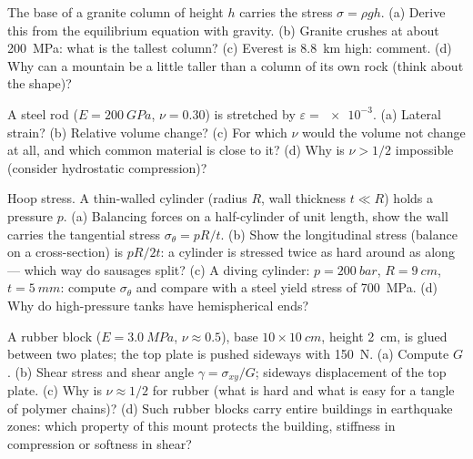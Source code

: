 \begin{exercise}[$\star$]\label{exo:b3:continuum-elasticity:3}
The base of a granite column of height $h$ carries the stress $\sigma
= \rho gh$. (a) Derive this from the equilibrium equation with
gravity. (b) Granite crushes at about \qty{200}{MPa}: what is the
tallest column? (c) Everest is \qty{8.8}{km} high: comment. (d) Why
can a mountain be a little taller than a column of its own rock
(think about the shape)?
\end{exercise}

\begin{exercise}[$\star$]\label{exo:b3:continuum-elasticity:4}
A steel rod ($E = \qty{200}{GPa}$, $\nu = 0.30$) is stretched by
$\varepsilon = \num{e-3}$. (a) Lateral strain? (b) Relative volume
change? (c) For which $\nu$ would the volume not change at all, and
which common material is close to it? (d) Why is $\nu > 1/2$
impossible (consider hydrostatic compression)?
\end{exercise}

\begin{exercise}[$\star\star$]\label{exo:b3:continuum-elasticity:5}
Hoop stress. A thin-walled cylinder (radius $R$, wall thickness $t \ll
R$) holds a pressure $p$. (a) Balancing forces on a half-cylinder of
unit length, show the wall carries the tangential stress
$\sigma_\theta = pR/t$. (b) Show the longitudinal stress (balance on a
cross-section) is $pR/2t$: a cylinder is stressed twice as hard around
as along --- which way do sausages split? (c) A diving cylinder: $p =
\qty{200}{bar}$, $R = \qty{9}{cm}$, $t = \qty{5}{mm}$: compute
$\sigma_\theta$ and compare with a steel yield stress of
\qty{700}{MPa}. (d) Why do high-pressure tanks have hemispherical
ends?
\end{exercise}

\begin{exercise}[$\star\star$]\label{exo:b3:continuum-elasticity:6}
A rubber block ($E = \qty{3.0}{MPa}$, $\nu \approx 0.5$), base $10
\times \qty{10}{cm}$, height \qty{2}{cm}, is glued between two plates;
the top plate is pushed sideways with \qty{150}{N}. (a) Compute $G$.
(b) Shear stress and shear angle $\gamma = \sigma_{xy}/G$; sideways
displacement of the top plate. (c) Why is $\nu \approx 1/2$ for
rubber (what is hard and what is easy for a tangle of polymer
chains)? (d) Such rubber blocks carry entire buildings in earthquake
zones: which property of this mount protects the building, stiffness
in compression or softness in shear?
\end{exercise}

